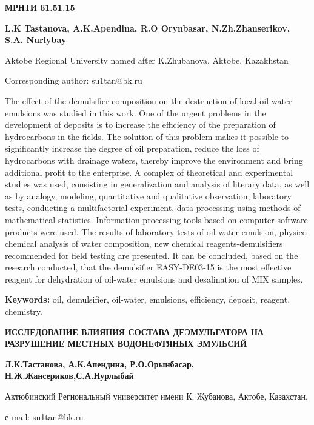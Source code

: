 \newpage
{\bfseries МРНТИ 61.51.15}


\begin{center}
{\bfseries L.K Tastanova, A.K.Apendina, R.O Orynbasar, N.Zh.Zhanserikov, S.A. Nurlybay}

Aktobe Regional University named after K.Zhubanova, Aktobe, Kazakhstan

Corresponding author: su1tan@bk.ru
\end{center}

The effect of the demulsifier composition on the destruction of local
oil-water emulsions was studied in this work. One of the urgent problems
in the development of deposits is to increase the efficiency of the
preparation of hydrocarbons in the fields. The solution of this problem
makes it possible to significantly increase the degree of oil
preparation, reduce the loss of hydrocarbons with drainage waters,
thereby improve the environment and bring additional profit to the
enterprise. A complex of theoretical and experimental studies was used,
consisting in generalization and analysis of literary data, as well as
by analogy, modeling, quantitative and qualitative observation,
laboratory tests, conducting a multifactorial experiment, data
processing using methods of mathematical statistics. Information
processing tools based on computer software products were used. The
results of laboratory tests of oil-water emulsion, physico-chemical
analysis of water composition, new chemical reagents-demulsifiers
recommended for field testing are presented. It can be concluded, based
on the research conducted, that the demulsifier EASY-DE03-15 is the most
effective reagent for dehydration of oil-water emulsions and
desalination of MIX samples.

{\bfseries Keywords:} oil, demulsifier, oil-water, emulsions, efficiency,
deposit, reagent, chemistry.

\begin{center}
{\large\bfseries ИССЛЕДОВАНИЕ ВЛИЯНИЯ СОСТАВА ДЕЭМУЛЬГАТОРА НА РАЗРУШЕНИЕ МЕСТНЫХ ВОДОНЕФТЯНЫХ ЭМУЛЬСИЙ}

{\bfseries Л.К.Тастанова, А.К.Апендина, Р.О.Орынбасар, Н.Ж.Жансериков,С.А.Нурлыбай}

Актюбинский Региональный университет имени К. Жубанова, Актобе,
Казахстан,

е-mail: su1tan@bk.ru
\end{center}


